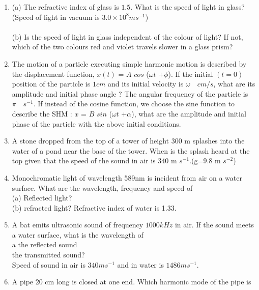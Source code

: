 \begin{enumerate}[label=\thesection.\arabic*,ref=\thesection.\theenumi]
\item
(a) The refractive index of glass is $1.5$. What is the speed of light in
glass?(Speed of light in vacuum is $3.0\times 10^{8} m s^{-1}$) \\
\\
(b) Is the speed of light in glass independent of the colour of light? If
not, which of the two colours red and violet travels slower in a
glass prism?\\
\solution
\pagebreak
\item
The motion of a particle executing simple harmonic motion is described by the
displacement function, $x(t)$ = $A$ $cos$ ($\omega$$t$ +$\phi$).
If the initial $(t = 0)$ position of the particle is $1 cm$ and its initial velocity is $\omega\quad cm/s$, what are its amplitude and initial phase angle ? The angular frequency of the particle is $\pi\quad s^{-1}$. If instead of the cosine function, we choose the sine function to describe the SHM : $x$ = $B$ $sin$ ($\omega$$t$ +$\alpha$), what are the amplitude and initial phase of the
particle with the above initial conditions.\\
\solution
\pagebreak

\item A stone dropped from the top of a tower of height $300$ m splashes into the water of a pond near the base of the tower. When is the splash heard at the top given that the speed of the sound in air is $340$ m $s^{-1}$.(g=$9.8$ m $s^{-2}$)\\
\solution
\pagebreak

\item Monochromatic light of wavelength 589nm is incident from air on a
water surface. What are the wavelength, frequency and speed of\\
(a) Reflected light?\\
(b) refracted light? Refractive index of water is 1.33.\\
\solution
\pagebreak
\item A bat emits ultrasonic sound of frequency $1000 kHz$ in air. If the sound meets a water surface, what is the wavelength of\\[0pt] \brak a the reflected sound \\[0pt]
 the transmitted sound?\\
Speed of sound in air is $340 ms^{-1}$ and in water is $1486 ms^{-1}$.\\
\solution
\pagebreak

\item A pipe 20 cm long is closed at one end. Which harmonic mode of the pipe is


\end{enumerate}
